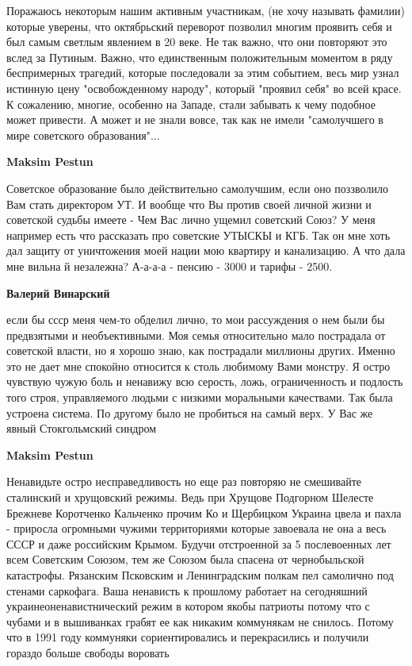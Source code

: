 \begin{itemize}

Поражаюсь некоторым нашим активным участникам, (не хочу называть фамилии)
которые уверены, что октябрьский переворот позволил многим проявить себя и был
самым светлым явлением в 20 веке. Не так важно, что они повторяют это вслед за
Путиным. Важно, что единственным положительным моментом в ряду беспримерных
трагедий, которые последовали за этим событием, весь мир узнал истинную цену
"освобожденному народу", который "проявил себя" во всей красе. К сожалению,
многие, особенно на Западе, стали забывать к чему подобное может привести. А
может и не знали вовсе, так как не имели "самолучшего в мире советского
образования"...

\begin{itemize} %
\textbf{Maksim Pestun} 

Советское образование было действительно самолучшим, если оно поззволило Вам
стать директором УТ. И вообще что Вы против своей личной жизни и советской
судьбы имеете - Чем Вас лично ущемил советский Союз? У меня например есть что
рассказать про советские УТЫСКЫ и КГБ. Так он мне хоть дал защиту от
уничтожения моей нации мою квартиру и канализацию. А что дала мне вильна й
незалежна? А-а-а-а - пенсию - 3000 и тарифы - 2500.

\begin{itemize} %
\textbf{Валерий Винарский} 

если бы ссср меня чем-то обделил лично, то мои рассуждения о нем были бы
предвзятыми и необъективными. Моя семья относительно мало пострадала от
советской власти, но я хорошо знаю, как пострадали миллионы других. Именно это
не дает мне спокойно относится к столь любимому Вами монстру. Я остро чувствую
чужую боль и ненавижу всю серость, ложь, ограниченность и подлость того строя,
управляемого людьми с низкими моральными качествами. Так была устроена система.
По другому было не пробиться на самый верх. У Вас же явный Стокгольмский
синдром

\textbf{Maksim Pestun} 

Ненавидьте остро несправедливость но еще раз повторяю не смешивайте сталинский
и хрущовский режимы. Ведь при Хрущове Подгорном Шелесте Брежневе Коротченко
Кальченко прочим Ко и Щербицком Украина цвела и пахла - приросла огромными
чужими территориями которые завоевала не она а весь СССР и даже российским
Крымом. Будучи отстроенной за 5 послевоенных лет всем Советским Союзом, тем же
Союзом была спасена от чернобыльской катастрофы. Рязанским Псковским и
Ленинградским полкам пел самолично под стенами саркофага. Ваша ненависть к
прошлому работает на сегодняшний украинеоненавистнический режим в котором якобы
патриоты потому что с чубами и в вышиванках грабят ее как никаким коммунякам не
снилось. Потому что в 1991 году коммуняки сориентировались и перекрасились и
получили гораздо больше свободы воровать


\end{itemize}
\end{itemize}
\end{itemize}
